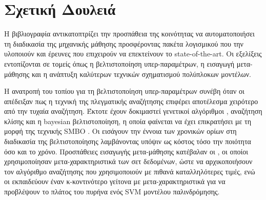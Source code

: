 \chapter{Σχετική Δουλειά}
Η βιβλιογραφία αντικατοπτρίζει την προσπάθεια της κοινότητας να αυτοματοποιήσει τη διαδικασία της μηχανικής μάθησης προσφέροντας πακέτα λογισμικού που την υλοποιούν και έρευνες που επιχειρούν να επεκτείνουν το state-of-the-art. Οι εξελίξεις εντοπίζονται σε τομείς όπως η βελτιστοποίηση υπερ-παραμέτρων, η εισαγωγή μετα-μάθησης και η ανάπτυξη καλύτερων τεχνικών σχηματισμού πολύπλοκων μοντέλων.

Η ανατροπή του τοπίου για τη βελτιστοποίηση υπερ-παραμέτρων συνέβη όταν οι \citet{} απέδειξαν πως η τεχνική της πλεγματικής αναζήτησης επιφέρει αποτέλεσμα χειρότερο από την τυχαία αναζήτηση. Έκτοτε έχουν δοκιμαστεί γενετικοί αλγόριθμοι \citep{1554741}, αναζήτηση κλίσης \citep{wassenberg} και η bayesian βελτιστοποίηση, η οποία φαίνεται να έχει επικρατήσει με τη μορφή της τεχνικής SMBO \citep{DBLP:journals/corr/abs-1208-3719}. Οι \citet{HutHooLeyMur10} εισάγουν την έννοια των χρονικών ορίων στη διαδικασία της βελτιστοποίησης λαμβάνοντας υπόψιν ως κόστος τόσο την ποιότητα όσο και το χρόνο. Προσπάθειες εισαγωγής μετα-μάθησης κατέβαλαν οι \citet{Feurer:2014:UMI:3015544.3015549}, οι οποίοι χρησιμοποίησαν μετα-χαρακτηριστικά των σετ δεδομένων, ώστε να αρχικοποιήσουν τον αλγόριθμο αναζήτησης που χρησιμοποιούν με πιθανά καταλληλότερες τιμές, ενώ οι \citet{Soares2004} εκπαιδεύουν έναν κ-κοντινότερο γείτονα με μετα-χαρακτηριστικά για να προβλέψουν το πλάτος του πυρήνα ενός SVM μοντέλου παλινδρόμησης.